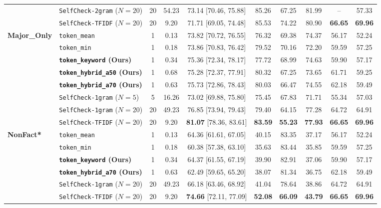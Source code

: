 \documentclass[conference]{IEEEtran}
\begin{document}
\begin{table}[t]
{\begin{tabular}{llcccccccc}
& \texttt{SelfCheck-2gram} ($N=20$) & 20 & 54.23 & 73.14 [70.46, 75.88] & 85.26 & 67.25 & 81.99 & -- & 57.33 \\
& \texttt{SelfCheck-TFIDF} ($N=20$) & 20 & 9.20 & 71.71 [69.05, 74.48] & 85.53 & 74.22 & 80.90 & \textbf{66.65} & \textbf{69.96} \\
\midrule
\multirow{8}{*}{\textbf{Major\_Only}}
& \texttt{token\_mean} & 1 & 0.13 & 73.82 [70.72, 76.55] & 76.32 & 69.38 & 74.37 & 56.17 & 52.24 \\
& \texttt{token\_min} & 1 & 0.18 & 73.86 [70.83, 76.42] & 79.52 & 70.16 & 72.20 & 59.59 & 57.25 \\
& \textbf{\texttt{token\_keyword} (Ours)} & 1 & 0.34 & 75.36 [72.34, 78.17] & 77.72 & 68.99 & 74.63 & 59.90 & 57.17 \\
& \textbf{\texttt{token\_hybrid\_a50} (Ours)} & 1 & 0.68 & 75.28 [72.37, 77.91] & 80.32 & 67.25 & 73.65 & 61.71 & 59.25 \\
& \textbf{\texttt{token\_hybrid\_a70} (Ours)} & 1 & 0.63 & 75.73 [72.86, 78.43] & 80.03 & 66.47 & 74.55 & 62.18 & 59.49 \\
& \texttt{SelfCheck-1gram} ($N=5$) & 5 & 16.26 & 73.02 [69.88, 75.80] & 75.45 & 67.83 & 71.71 & 55.34 & 57.03 \\
& \texttt{SelfCheck-1gram} ($N=20$) & 20 & 49.23 & 76.85 [73.94, 79.43] & 79.40 & 64.15 & 77.28 & 64.72 & 64.91 \\
& \texttt{SelfCheck-TFIDF} ($N=20$) & 20 & 9.20 & \textbf{81.07} [78.36, 83.61] & \textbf{83.59} & \textbf{55.23} & \textbf{77.93} & \textbf{66.65} & \textbf{69.96} \\
\midrule
\multirow{6}{*}{\textbf{NonFact*}}
& \texttt{token\_mean} & 1 & 0.13 & 64.36 [61.61, 67.05] & 40.15 & 83.35 & 37.17 & 56.17 & 52.24 \\
& \texttt{token\_min} & 1 & 0.18 & 60.38 [57.38, 63.10] & 35.63 & 83.44 & 35.85 & 59.59 & 57.25 \\
& \textbf{\texttt{token\_keyword} (Ours)} & 1 & 0.34 & 64.37 [61.55, 67.19] & 39.90 & 82.91 & 37.06 & 59.90 & 57.17 \\
& \textbf{\texttt{token\_hybrid\_a70} (Ours)} & 1 & 0.63 & 62.49 [59.65, 65.20] & 38.07 & 81.34 & 36.75 & 62.18 & 59.49 \\
& \texttt{SelfCheck-1gram} ($N=20$) & 20 & 49.23 & 66.18 [63.46, 68.92] & 41.04 & 78.64 & 38.86 & 64.72 & 64.91 \\
& \texttt{SelfCheck-TFIDF} ($N=20$) & 20 & 9.20 & \textbf{74.66} [72.11, 77.09] & \textbf{52.08} & \textbf{66.09} & \textbf{43.79} & \textbf{66.65} & \textbf{69.96} \\
\bottomrule
\end{tabular}%
}
\end{table}
\end{document}
